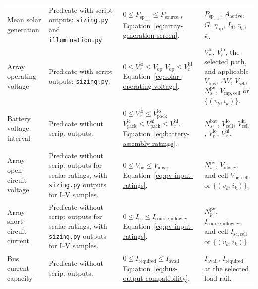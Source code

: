 \begin{longtable}{@{}P{0.18\ReportTableBodyWidth}P{0.21\ReportTableBodyWidth}P{0.29\ReportTableBodyWidth}P{0.32\ReportTableBodyWidth}@{}}
\addlinespace[4pt]
Mean solar generation & Predicate with script outputs: \texttt{sizing.py} and \texttt{illumination.py}. & $0\leq P_{\mathrm{sp}_{\min}}\leq\overline P_{\mathrm{source},s}$ \newline Equation~\eqref{eq:array-generation-screen}. & $P_{\mathrm{sp}_{\min}}$, $A_{\mathrm{active}}$, $G$, $\eta_{\mathrm{op}}$, $I_d$, $\eta_a$, $\overline\kappa$. \\
\addlinespace[4pt]
Array operating voltage & Predicate with script outputs: \texttt{sizing.py}. & $0\leq V_r^{\mathrm{lo}}\leq V_{\mathrm{op}}$ \newline $V_{\mathrm{op}}\leq V_r^{\mathrm{hi}}$. \newline Equation~\eqref{eq:solar-operating-voltage}. & $V_r^{\mathrm{lo}}$, $V_r^{\mathrm{hi}}$, the selected path, and applicable $V_{\mathrm{bus}}$, $\Delta V$, $V_{\mathrm{set}}$, $N_s^{\mathrm{pv}}$, $V_{\mathrm{mp,cell}}$ or $\{(v_k,i_k)\}$. \\
\addlinespace[4pt]
Battery voltage interval & Predicate without script outputs. & $0\leq V_r^{\mathrm{lo}}\leq V_{\mathrm{pack}}^{\mathrm{lo}}$ \newline $V_{\mathrm{pack}}^{\mathrm{lo}}\leq V_{\mathrm{pack}}^{\mathrm{hi}}\leq V_r^{\mathrm{hi}}$. \newline Equation~\eqref{eq:battery-assembly-ratings}. & $N_s^{\mathrm{bat}}$, $V_{\mathrm{cell}}^{\mathrm{lo}}$, $V_{\mathrm{cell}}^{\mathrm{hi}}$, $V_r^{\mathrm{lo}}$, $V_r^{\mathrm{hi}}$. \\
\addlinespace[4pt]
Array open-circuit voltage & Predicate without script outputs for scalar ratings, with \texttt{sizing.py} outputs for I--V samples. & $0\leq V_{\mathrm{oc}}\leq V_{\mathrm{abs},r}$ \newline Equation~\eqref{eq:pv-input-ratings}. & $N_s^{\mathrm{pv}}$, $V_{\mathrm{abs},r}$, and cell $V_{\mathrm{oc,cell}}$ or $\{(v_k,i_k)\}$. \\
\addlinespace[4pt]
Array short-circuit current & Predicate without script outputs for scalar ratings, with \texttt{sizing.py} outputs for I--V samples. & $0\leq I_{\mathrm{sc}}\leq I_{\mathrm{source,allow},r}$ \newline Equation~\eqref{eq:pv-input-ratings}. & $N_p^{\mathrm{pv}}$, $I_{\mathrm{source,allow},r}$, and cell $I_{\mathrm{sc,cell}}$ or $\{(v_k,i_k)\}$. \\
\addlinespace[4pt]
Bus current capacity & Predicate without script outputs. & $0\leq I_{\mathrm{required}}\leq I_{\mathrm{avail}}$ \newline Equation~\eqref{eq:bus-output-compatibility}. & $I_{\mathrm{avail}}$, $I_{\mathrm{required}}$ at the selected load rail. \\

\end{longtable}
